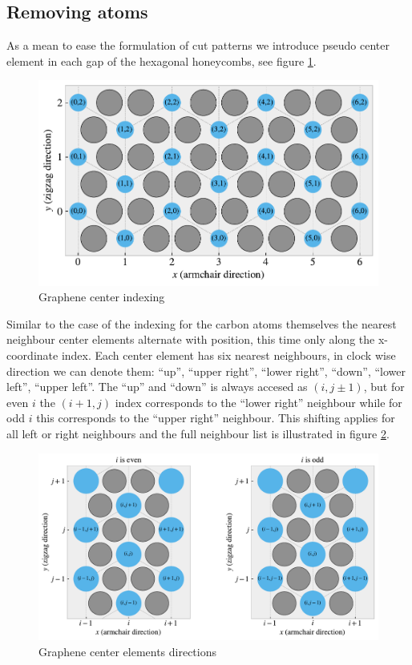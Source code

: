 \subsection{Removing atoms}

As a mean to ease the formulation of cut patterns we introduce pseudo center
element in each gap of the hexagonal honeycombs, see figure
\ref{fig:center_indexing}. 

\begin{figure}[H]
  \centering
  \includegraphics[width=0.7\linewidth]{figures/system/center_indexing.pdf}
  \caption{Graphene center indexing}
  \label{fig:center_indexing}
\end{figure}


Similar to the case of the indexing for the carbon atoms themselves the nearest
neighbour center elements alternate with position, this time only along the
x-coordinate index. Each center element has six nearest neighbours, in clock wise
direction we can denote them: ``up'', ``upper right'', ``lower right'',
``down'', ``lower left'', ``upper left''. The ``up'' and ``down'' is always
accesed as $(i,j\pm 1)$, but for even $i$ the $(i+1,j)$ index corresponds to the
``lower right'' neighbour while for odd $i$ this corresponds to the ``upper
right'' neighbour. This shifting applies for all left or right neighbours and
the full neighbour list is illustrated in figure \ref{fig:center_directions}. 


\begin{figure}[H]
  \centering
  \includegraphics[width=0.7\linewidth]{figures/system/center_directions.pdf}
  \caption{Graphene center elements directions}
  \label{fig:center_directions}
\end{figure}


